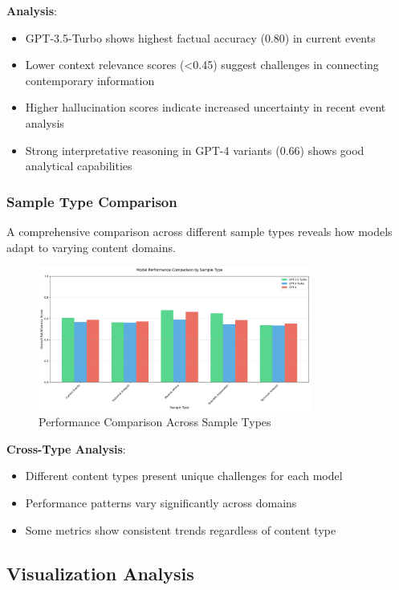 \textbf{Analysis}:
\begin{itemize}
    \item GPT-3.5-Turbo shows highest factual accuracy (0.80) in current events
    \item Lower context relevance scores (<0.45) suggest challenges in connecting contemporary information
    \item Higher hallucination scores indicate increased uncertainty in recent event analysis
    \item Strong interpretative reasoning in GPT-4 variants (0.66) shows good analytical capabilities
\end{itemize}

\subsubsection{Sample Type Comparison}
A comprehensive comparison across different sample types reveals how models adapt to varying content domains.

\begin{figure}[!htbp]
\centering
\includegraphics[width=0.8\textwidth]{figures/types/type_comparison.png}
\caption{Performance Comparison Across Sample Types}
\label{fig:type_comparison}
\end{figure}

\textbf{Cross-Type Analysis}:
\begin{itemize}
    \item Different content types present unique challenges for each model
    \item Performance patterns vary significantly across domains
    \item Some metrics show consistent trends regardless of content type
\end{itemize}

\subsection{Visualization Analysis}

